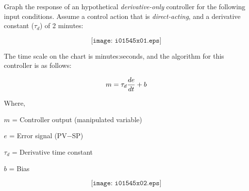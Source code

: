 

Graph the response of an hypothetical {\it derivative-only} controller for the following input conditions.  Assume a control action that is {\it direct-acting}, and a derivative constant ($\tau_d$) of 2 minutes:

$$\texttt{[image: i01545x01.eps]}$$

The time scale on the chart is minutes:seconds, and the algorithm for this controller is as follows:

$$m = \tau_d {de \over dt} + b$$

\noindent
Where,

$m$ = Controller output (manipulated variable)

$e$ = Error signal (PV$-$SP)

$\tau_d$ = Derivative time constant

$b$ = Bias

\vskip 10pt







$$\texttt{[image: i01545x02.eps]}$$












